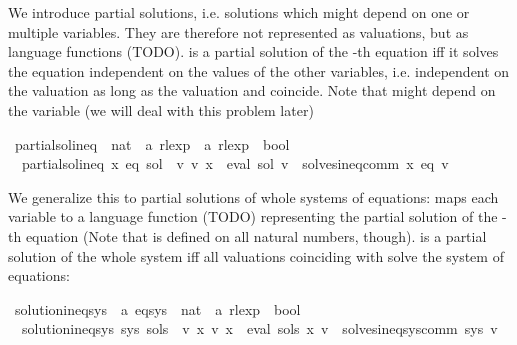 \begin{isabellebody}
\begin{isamarkuptext}%
We introduce partial solutions, i.e. solutions which might depend on one or multiple variables.
They are therefore not represented as valuations, but as language functions (TODO).  is a partial
solution of the -th equation iff it solves the equation independent on the values of the other
variables, i.e. independent on the valuation as long as the valuation and  coincide.
Note that  might depend on the variable  (we will deal with this problem later)%
\end{isamarkuptext}\isamarkuptrue%
\isamarkupfalse%
\ partial{\isacharunderscore}{\kern0pt}sol{\isacharunderscore}{\kern0pt}ineq\ {\isacharcolon}{\kern0pt}{\isacharcolon}{\kern0pt}\ {\isachardoublequoteopen}nat\ {\isasymRightarrow}\ {\isacharprime}{\kern0pt}a\ rlexp\ {\isasymRightarrow}\ {\isacharprime}{\kern0pt}a\ rlexp\ {\isasymRightarrow}\ bool{\isachardoublequoteclose}\ \isanewline
\ \ {\isachardoublequoteopen}partial{\isacharunderscore}{\kern0pt}sol{\isacharunderscore}{\kern0pt}ineq\ x\ eq\ sol\ {\isasymequiv}\ {\isasymforall}v{\isachardot}{\kern0pt}\ v\ x\ {\isacharequal}{\kern0pt}\ eval\ sol\ v\ {\isasymlongrightarrow}\ solves{\isacharunderscore}{\kern0pt}ineq{\isacharunderscore}{\kern0pt}comm\ x\ eq\ v{\isachardoublequoteclose}%
\begin{isamarkuptext}%
We generalize this to partial solutions of whole systems of equations:
 maps each variable  to a language function (TODO) representing the partial solution
of the -th equation (Note that  is defined on all natural numbers, though).
 is a partial solution of the whole system iff all valuations coinciding with  solve
the system of equations:%
\end{isamarkuptext}\isamarkuptrue%
\isamarkupfalse%
\ solution{\isacharunderscore}{\kern0pt}ineq{\isacharunderscore}{\kern0pt}sys\ {\isacharcolon}{\kern0pt}{\isacharcolon}{\kern0pt}\ {\isachardoublequoteopen}{\isacharprime}{\kern0pt}a\ eq{\isacharunderscore}{\kern0pt}sys\ {\isasymRightarrow}\ {\isacharparenleft}{\kern0pt}nat\ {\isasymRightarrow}\ {\isacharprime}{\kern0pt}a\ rlexp{\isacharparenright}{\kern0pt}\ {\isasymRightarrow}\ bool{\isachardoublequoteclose}\ \isanewline
\ \ {\isachardoublequoteopen}solution{\isacharunderscore}{\kern0pt}ineq{\isacharunderscore}{\kern0pt}sys\ sys\ sols\ {\isasymequiv}\ {\isasymforall}v{\isachardot}{\kern0pt}\ {\isacharparenleft}{\kern0pt}{\isasymforall}x{\isachardot}{\kern0pt}\ v\ x\ {\isacharequal}{\kern0pt}\ eval\ {\isacharparenleft}{\kern0pt}sols\ x{\isacharparenright}{\kern0pt}\ v{\isacharparenright}{\kern0pt}\ {\isasymlongrightarrow}\ solves{\isacharunderscore}{\kern0pt}ineq{\isacharunderscore}{\kern0pt}sys{\isacharunderscore}{\kern0pt}comm\ sys\ v{\isachardoublequoteclose}%

\end{isabellebody}
